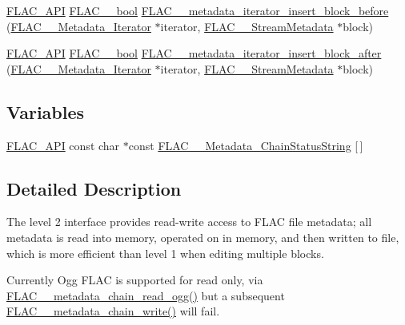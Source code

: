 \begin{DoxyCompactItemize}
\item 
\mbox{\hyperlink{group__flac__export_ga56ca07df8a23310707732b1c0007d6f5}{F\+L\+A\+C\+\_\+\+A\+PI}} \mbox{\hyperlink{ordinals_8h_a95103469f1cbd78b8cf250194985b34e}{F\+L\+A\+C\+\_\+\+\_\+bool}} \mbox{\hyperlink{group__flac__metadata__level2_ga163c1b4d8fdd72c0d6fb8816b2ae9b18}{F\+L\+A\+C\+\_\+\+\_\+metadata\+\_\+iterator\+\_\+insert\+\_\+block\+\_\+before}} (\mbox{\hyperlink{group__flac__metadata__level2_ga9f3e135a07cdef7e51597646aa7b89b2}{F\+L\+A\+C\+\_\+\+\_\+\+Metadata\+\_\+\+Iterator}} $\ast$iterator, \mbox{\hyperlink{struct_f_l_a_c_____stream_metadata}{F\+L\+A\+C\+\_\+\+\_\+\+Stream\+Metadata}} $\ast$block)
\item 
\mbox{\hyperlink{group__flac__export_ga56ca07df8a23310707732b1c0007d6f5}{F\+L\+A\+C\+\_\+\+A\+PI}} \mbox{\hyperlink{ordinals_8h_a95103469f1cbd78b8cf250194985b34e}{F\+L\+A\+C\+\_\+\+\_\+bool}} \mbox{\hyperlink{group__flac__metadata__level2_ga2f9d8e02bd2e5ffb235af0b02d347d47}{F\+L\+A\+C\+\_\+\+\_\+metadata\+\_\+iterator\+\_\+insert\+\_\+block\+\_\+after}} (\mbox{\hyperlink{group__flac__metadata__level2_ga9f3e135a07cdef7e51597646aa7b89b2}{F\+L\+A\+C\+\_\+\+\_\+\+Metadata\+\_\+\+Iterator}} $\ast$iterator, \mbox{\hyperlink{struct_f_l_a_c_____stream_metadata}{F\+L\+A\+C\+\_\+\+\_\+\+Stream\+Metadata}} $\ast$block)
\end{DoxyCompactItemize}
\subsection*{Variables}
\begin{DoxyCompactItemize}
\item 
\mbox{\hyperlink{group__flac__export_ga56ca07df8a23310707732b1c0007d6f5}{F\+L\+A\+C\+\_\+\+A\+PI}} const char $\ast$const \mbox{\hyperlink{group__flac__metadata__level2_gabb4646b4af36d17497676759767f8cc7}{F\+L\+A\+C\+\_\+\+\_\+\+Metadata\+\_\+\+Chain\+Status\+String}} \mbox{[}$\,$\mbox{]}
\end{DoxyCompactItemize}


\subsection{Detailed Description}
The level 2 interface provides read-\/write access to F\+L\+AC file metadata; all metadata is read into memory, operated on in memory, and then written to file, which is more efficient than level 1 when editing multiple blocks. 

Currently Ogg F\+L\+AC is supported for read only, via \mbox{\hyperlink{group__flac__metadata__level2_gae7b34f2929bedea0e14ac14aca253a40}{F\+L\+A\+C\+\_\+\+\_\+metadata\+\_\+chain\+\_\+read\+\_\+ogg()}} but a subsequent \mbox{\hyperlink{group__flac__metadata__level2_gaa15ead7230217de8e79f4af822cda490}{F\+L\+A\+C\+\_\+\+\_\+metadata\+\_\+chain\+\_\+write()}} will fail.

